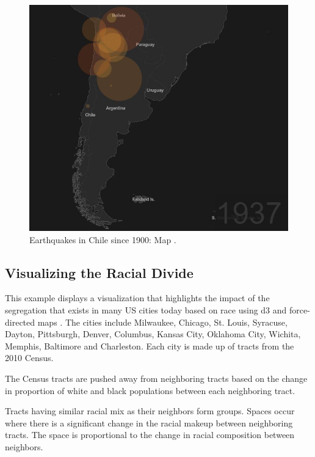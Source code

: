\documentclass[9pt,twocolumn,twoside]{../../styles/osajnl}
\begin{document}
\begin{figure}[h]
\centering
\includegraphics[scale=0.3]{images/3}
\centering
\caption{Earthquakes in Chile since 1900: Map \cite{www-map}.}
\end{figure}

\subsection{Visualizing the Racial Divide}
This example displays a visualization that highlights the impact of the segregation that exists in many US cities today based on race using d3 and force-directed maps \cite{www-fdm}. The cities include Milwaukee, Chicago, St. Louis, Syracuse, Dayton, Pittsburgh, Denver, Columbus, Kansas City, Oklahoma City, Wichita, Memphis, Baltimore and Charleston. Each city is made up of tracts from the 2010 Census.

The Census tracts are pushed away from neighboring tracts based on the change in proportion of white and black populations between each neighboring tract.

Tracts having similar racial mix as their neighbors form groups. Spaces occur where there is a significant change in the racial makeup between neighboring tracts. The space is proportional to the change in racial composition between neighbors. 
\end{document}
